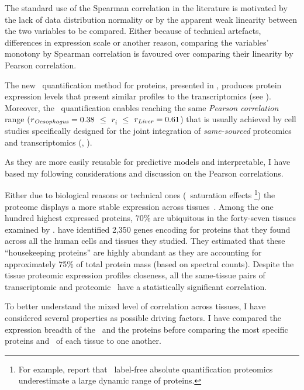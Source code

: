 The standard use of the Spearman correlation in the literature
is motivated by the lack of data distribution normality
or by the apparent weak linearity between the two variables to be compared.
Either because of technical artefacts,
differences in expression scale or another reason,
comparing the variables' monotony by Spearman correlation
is favoured over comparing their linearity by Pearson correlation.

The new \PPKM\ quantification method for proteins,
presented in ,
produces protein expression levels
that present similar profiles to the transcriptomics (see ).
Moreover, the \PPKM\ quantification enables
reaching the same \emph{Pearson correlation} range
($r_{\text{\emph{Oesophagus}}}=0.38$ $≤$ $r_i$  $≤$ $r_{\text{\emph{Liver}}}=0.61$)
that is usually achieved by cell studies specifically designed
for the joint integration of \emph{same-sourced} proteomics and transcriptomics
(\eg, \citet{Marguerat2012-sn,schwanhausserglobal:2011,Schwanhausser2013-et,Li2014-ai}).

As they are more easily reusable for predictive models and interpretable,
I have based my following considerations and discussion
on the Pearson correlations.\mybr\

Either due to biological reasons or technical ones (\eg\ saturation effects%
\footnote{For example, \citet{TOP3isbetter} report that
\ms\ label-free absolute quantification proteomics underestimate
a large dynamic range of proteins.})
the proteome displays a more stable expression across
tissues~.
Among the one hundred highest expressed proteins,
70\% are ubiquitous in the forty-seven tissues examined by \citet{KusterData}.
\citet{PandeyData} have identified 2,350 genes encoding for proteins
that they found across all the human cells and tissues they studied.
They estimated that these \enquote{housekeeping proteins} are
highly abundant as they are accounting for approximately 75\% of total protein mass
(based on spectral counts).
Despite the tissue proteomic expression profiles closeness,
all the same-tissue pairs of transcriptomic and proteomic \treps\
have a statistically significant correlation.

To better understand the mixed level of correlation across tissues,
I have considered several properties as possible driving factors.
I have compared the expression breadth of the \mRNAs\ and the proteins
before comparing the most specific proteins and \mRNAs\ of each tissue
to one another.\mybr\

